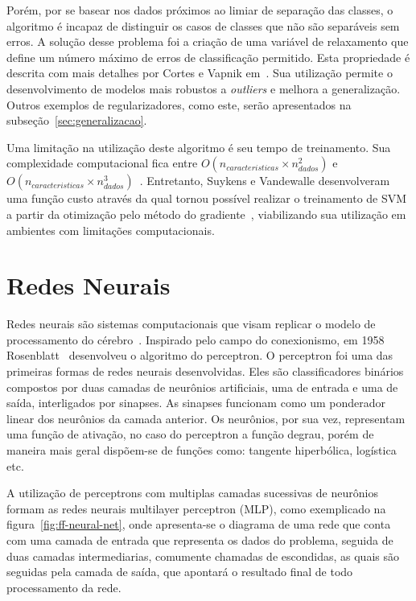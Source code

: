 Porém, por se basear nos dados próximos ao limiar de separação das classes, o algoritmo é incapaz de distinguir os casos
de classes que não são separáveis sem erros.
A solução desse problema foi a criação de uma variável de relaxamento que define um número máximo de erros de
classificação permitido.
Esta propriedade é descrita com mais detalhes por Cortes e Vapnik em~\cite{cortes95}.
Sua utilização permite o desenvolvimento de modelos mais robustos a \textit{outliers} e melhora a generalização.
Outros exemplos de regularizadores, como este, serão apresentados na subseção~\ref{sec:generalizacao}.

Uma limitação na utilização deste algoritmo é seu tempo de treinamento.
Sua complexidade computacional fica entre $O(n_{caracteristicas} \times n_{dados}^2)$ e
$O(n_{caracteristicas} \times n_{dados}^3)$~\cite{list09}.
Entretanto, Suykens e Vandewalle desenvolveram uma função custo através da qual tornou possível realizar o treinamento
de SVM a partir da otimização pelo método do gradiente~\cite{suykens99}, viabilizando sua utilização em ambientes com
limitações computacionais.

\section{Redes Neurais} \label{sec:nn}

Redes neurais são sistemas computacionais que visam replicar o modelo de processamento do cérebro~\cite{wiener61}.
Inspirado pelo campo do conexionismo, em 1958 Rosenblatt~\cite{rosenblatt58} desenvolveu o algoritmo do perceptron.
O perceptron foi uma das primeiras formas de redes neurais desenvolvidas.
Eles são classificadores binários compostos por duas camadas de neurônios artificiais, uma de entrada e uma de saída,
interligados por sinapses.
As sinapses funcionam como um ponderador linear dos neurônios da camada anterior.
Os neurônios, por sua vez, representam uma função de ativação, no caso do perceptron a função degrau, porém de maneira
mais geral dispõem-se de funções como: tangente hiperbólica, logística etc.

A utilização de perceptrons com multiplas camadas sucessivas de neurônios formam as redes neurais multilayer perceptron
(MLP), como exemplicado na figura~\ref{fig:ff-neural-net}, onde apresenta-se o diagrama de uma rede que conta com uma
camada de entrada que representa os dados do problema, seguida de duas camadas intermediarias, comumente chamadas de
escondidas, as quais são seguidas pela camada de saída, que apontará o resultado final de todo processamento da rede.

